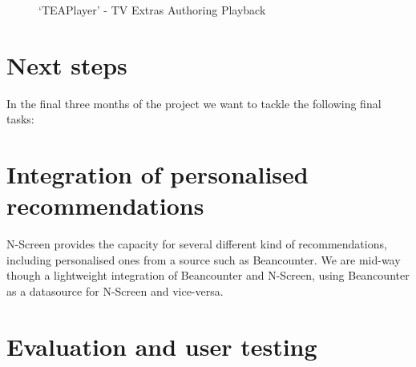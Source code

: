 \documentclass{notube}
\begin{document}
\begin{figure}
{}


\caption{`TEAPlayer' - TV Extras Authoring Playback}
\end{figure}


\section{Next steps}

In the final three months of the project we want to tackle the following final tasks:

\section{Integration of personalised recommendations}

N-Screen provides the capacity for several different kind of recommendations, including personalised ones from a source such as Beancounter. We are mid-way though a lightweight integration of Beancounter and N-Screen, using Beancounter as a datasource for N-Screen and vice-versa.

\section{Evaluation and user testing}
\end{document}
